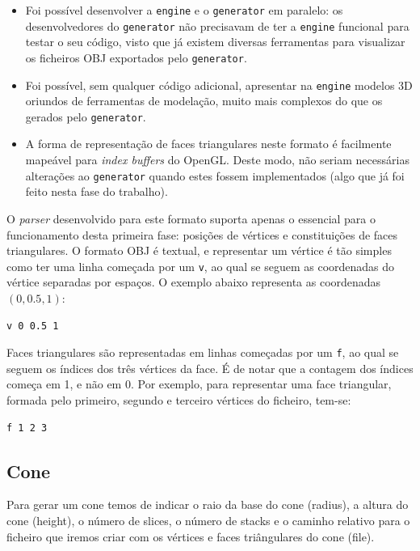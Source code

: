 \documentclass[12pt, a4paper]{article}
\begin{document}
\begin{itemize}
    \item Foi possível desenvolver a \texttt{engine} e o \texttt{generator} em paralelo: os
        desenvolvedores do \texttt{generator} não precisavam de ter a \texttt{engine} funcional para
        testar o seu código, visto que já existem diversas ferramentas para visualizar os ficheiros
        OBJ exportados pelo \texttt{generator}.

    \item Foi possível, sem qualquer código adicional, apresentar na \texttt{engine} modelos 3D
        oriundos de ferramentas de modelação, muito mais complexos do que os gerados pelo
        \texttt{generator}.

    \item A forma de representação de faces triangulares neste formato é facilmente mapeável para
        \emph{index buffers} do OpenGL. Deste modo, não seriam necessárias alterações ao
        \texttt{generator} quando estes fossem implementados (algo que já foi feito nesta fase do
        trabalho).
\end{itemize}

O \emph{parser} desenvolvido para este formato suporta apenas o essencial para o funcionamento desta
primeira fase: posições de vértices e constituições de faces triangulares. O formato OBJ é textual,
e representar um vértice é tão simples como ter uma linha começada por um \texttt{v}, ao qual se
seguem as coordenadas do vértice separadas por espaços. O exemplo abaixo representa as coordenadas
$(0, 0.5, 1)$:

\begin{verbatim}
v 0 0.5 1
\end{verbatim}

Faces triangulares são representadas em linhas começadas por um \texttt{f}, ao qual se seguem os
índices dos três vértices da face. É de notar que a contagem dos índices começa em 1, e não em 0.
Por exemplo, para representar uma face triangular, formada pelo primeiro, segundo e terceiro
vértices do ficheiro, tem-se:

\begin{verbatim}
f 1 2 3
\end{verbatim}

\subsection{Cone}
Para gerar um cone temos de indicar o raio da base do cone (radius), a altura do
cone (height), o número de slices, o número de stacks e o caminho relativo para o
ficheiro que iremos criar com os vértices e faces triângulares do cone (file).
\end{document}

